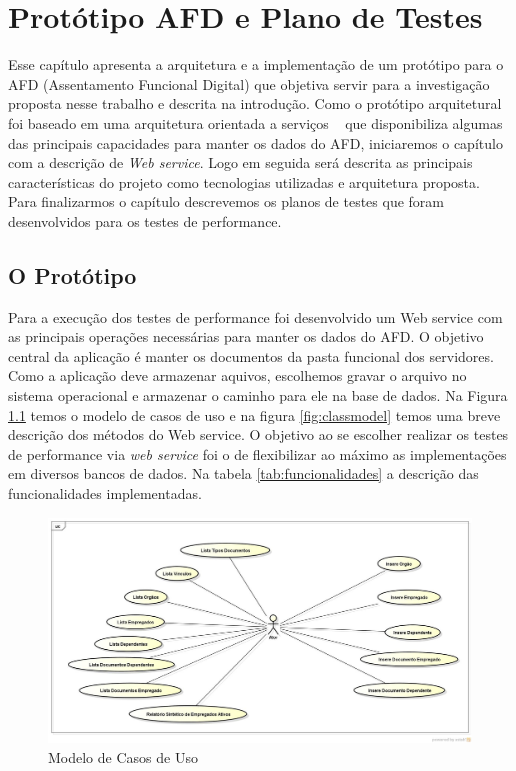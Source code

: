 \chapter{Protótipo AFD e Plano de Testes}

Esse capítulo apresenta a arquitetura e a implementação de um protótipo para o AFD (Assentamento Funcional Digital) que objetiva servir para a investigação proposta nesse trabalho e descrita na introdução. Como o protótipo arquitetural foi baseado em uma arquitetura orientada a serviços ~\cite{erl:2007} que disponibiliza algumas das principais capacidades para manter os dados do AFD, iniciaremos o capítulo com a descrição de \textit{Web service}. Logo em seguida será descrita as principais características do projeto como tecnologias utilizadas e arquitetura proposta. Para finalizarmos o capítulo descrevemos os planos de testes que foram desenvolvidos para os testes de performance.



\section{O Protótipo}

Para a execução dos testes de performance foi desenvolvido um Web service com as principais operações necessárias para manter os dados do AFD. O objetivo central da aplicação é manter os documentos da pasta funcional dos servidores. Como a aplicação deve armazenar aquivos, escolhemos gravar o arquivo no sistema operacional e armazenar o caminho para ele na base de dados. Na Figura \ref{fig:ucmodel} temos o modelo de casos de uso e na figura \ref{fig:classmodel} temos uma breve descrição dos métodos do Web service. O objetivo ao se escolher realizar os testes de performance via \textit{web service} foi o de flexibilizar ao máximo as implementações em diversos bancos de dados. Na tabela \ref{tab:funcionalidades} a descrição das funcionalidades implementadas.

	\begin{figure}[!htbp]
		\begin{center}
			\includegraphics[width=1\textwidth]{diagrama_geral}
		\end{center}
		\caption{Modelo de Casos de Uso}
		\label{fig:ucmodel}
	\end{figure}

